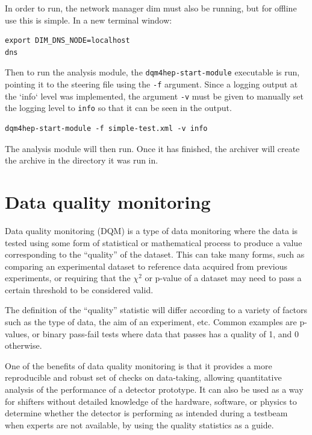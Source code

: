 In order to run, the network manager dim must also be running, but for offline use this is simple. In a new terminal window:

\begin{lstlisting}
export DIM_DNS_NODE=localhost
dns
\end{lstlisting}

Then to run the analysis module, the \texttt{dqm4hep-start-module} executable is run, pointing it to the steering file using the \texttt{-f} argument. Since a logging output at the `info` level was implemented, the argument \texttt{-v} must be given to manually set the logging level to \texttt{info} so that it can be seen in the output.

\begin{lstlisting}
dqm4hep-start-module -f simple-test.xml -v info
\end{lstlisting}

The analysis module will then run. Once it has finished, the archiver will create the archive in the directory it was run in.

\section{Data quality monitoring}
Data quality monitoring (\acrshort{DQM}) is a type of data monitoring where the data is tested using some form of statistical or mathematical process to produce a value corresponding to the ``quality'' of the dataset. This can take many forms, such as comparing an experimental dataset to reference data acquired from previous experiments, or requiring that the $\chi^2$ or p-value of a dataset may need to pass a certain threshold to be considered valid.

The definition of the ``quality'' statistic will differ according to a variety of factors such as the type of data, the aim of an experiment, etc. Common examples are p-values, or binary pass-fail tests where data that passes has a quality of 1, and 0 otherwise.

One of the benefits of data quality monitoring is that it provides a more reproducible and robust set of checks on data-taking, allowing quantitative analysis of the performance of a detector prototype. It can also be used as a way for shifters without detailed knowledge of the hardware, software, or physics to determine whether the detector is performing as intended during a testbeam when experts are not available, by using the quality statistics as a guide.

